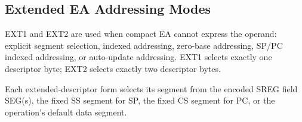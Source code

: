 \clearpage
\subsection{Extended EA Addressing Modes}\label{section:extended-ea-addressing}
EXT1 and EXT2 are used when compact EA cannot express the operand: explicit segment selection, indexed addressing,
zero-base addressing, SP/PC indexed addressing, or auto-update addressing. EXT1 selects exactly one descriptor byte;
EXT2 selects exactly two descriptor bytes.

Each extended-descriptor form selects its segment from the encoded SREG field SEG(s), the fixed SS segment for SP, the fixed CS
segment for PC, or the operation's default data segment.


